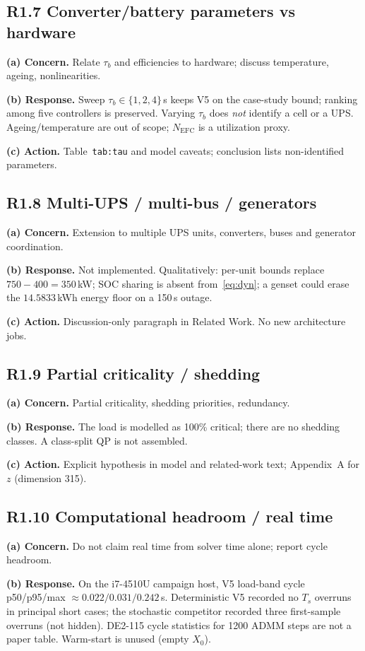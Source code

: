 \documentclass[11pt]{article}
\begin{document}
\subsection*{R1.7 Converter/battery parameters vs hardware}
\textbf{(a) Concern.} Relate $\tau_b$ and efficiencies to hardware; discuss temperature, ageing, nonlinearities.

\textbf{(b) Response.} Sweep $\tau_b\in\{1,2,4\}$\,s keeps V5 on the case-study bound; ranking among five controllers is preserved. Varying $\tau_b$ does \emph{not} identify a cell or a UPS. Ageing/temperature are out of scope; $N_{\mathrm{EFC}}$ is a utilization proxy.

\textbf{(c) Action.} Table~\texttt{tab:tau} and model caveats; conclusion lists non-identified parameters.

\subsection*{R1.8 Multi-UPS / multi-bus / generators}
\textbf{(a) Concern.} Extension to multiple UPS units, converters, buses and generator coordination.

\textbf{(b) Response.} Not implemented. Qualitatively: per-unit bounds replace $750-400=350$\,kW; SOC sharing is absent from~\eqref{eq:dyn}; a genset could erase the $14.5833$\,kWh energy floor on a 150\,s outage.

\textbf{(c) Action.} Discussion-only paragraph in Related Work. No new architecture jobs.

\subsection*{R1.9 Partial criticality / shedding}
\textbf{(a) Concern.} Partial criticality, shedding priorities, redundancy.

\textbf{(b) Response.} The load is modelled as 100\% critical; there are no shedding classes. A class-split QP is not assembled.

\textbf{(c) Action.} Explicit hypothesis in model and related-work text; Appendix~A for $z$ (dimension 315).

\subsection*{R1.10 Computational headroom / real time}
\textbf{(a) Concern.} Do not claim real time from solver time alone; report cycle headroom.

\textbf{(b) Response.} On the i7-4510U campaign host, V5 load-band cycle p50/p95/max $\approx 0.022/0.031/0.242$\,s. Deterministic V5 recorded no $T_s$ overruns in principal short cases; the stochastic competitor recorded three first-sample overruns (not hidden). DE2-115 cycle statistics for 1200 ADMM steps are not a paper table. Warm-start is unused (empty $X_0$).
\end{document}
